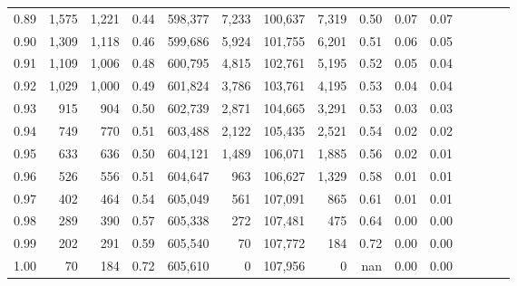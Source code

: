 \begin{tabular}{rrrcrrrrrrrrrrr}
0.89 &   1,575 &  1,221 &                                       0.44 &  598,377 &    7,233 &  100,637 &    7,319 &  0.50 &  0.07 &                         0.07 \\
0.90 &   1,309 &  1,118 &                                       0.46 &  599,686 &    5,924 &  101,755 &    6,201 &  0.51 &  0.06 &                         0.05 \\
0.91 &   1,109 &  1,006 &                                       0.48 &  600,795 &    4,815 &  102,761 &    5,195 &  0.52 &  0.05 &                         0.04 \\
0.92 &   1,029 &  1,000 &                                       0.49 &  601,824 &    3,786 &  103,761 &    4,195 &  0.53 &  0.04 &                         0.04 \\
0.93 &     915 &    904 &                                       0.50 &  602,739 &    2,871 &  104,665 &    3,291 &  0.53 &  0.03 &                         0.03 \\
0.94 &     749 &    770 &                                       0.51 &  603,488 &    2,122 &  105,435 &    2,521 &  0.54 &  0.02 &                         0.02 \\
0.95 &     633 &    636 &                                       0.50 &  604,121 &    1,489 &  106,071 &    1,885 &  0.56 &  0.02 &                         0.01 \\
0.96 &     526 &    556 &                                       0.51 &  604,647 &      963 &  106,627 &    1,329 &  0.58 &  0.01 &                         0.01 \\
0.97 &     402 &    464 &                                       0.54 &  605,049 &      561 &  107,091 &      865 &  0.61 &  0.01 &                         0.01 \\
0.98 &     289 &    390 &                                       0.57 &  605,338 &      272 &  107,481 &      475 &  0.64 &  0.00 &                         0.00 \\
0.99 &     202 &    291 &                                       0.59 &  605,540 &       70 &  107,772 &      184 &  0.72 &  0.00 &                         0.00 \\
1.00 &      70 &    184 &                                       0.72 &  605,610 &        0 &  107,956 &        0 &   nan &  0.00 &                         0.00 \\
\bottomrule
\end{tabular}
